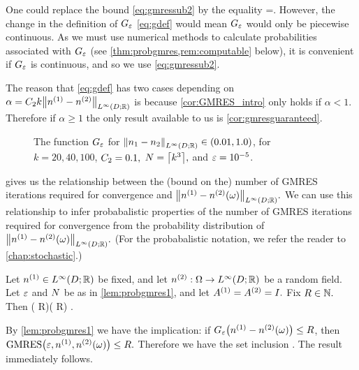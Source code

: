 One could replace the bound \cref{eq:gmressub2} by the equality
\beqs
\ms  =.
\eeqs
However, the change in the definition of $G_{\varepsilon}$ \cref{eq:gdef} would mean $G_{\varepsilon}$ would only be piecewise continuous. As we must use numerical methods to calculate probabilities associated with $G_{\varepsilon}$ (see \cref{thm:probgmres,rem:computable} below), it is convenient if $G_{\varepsilon}$ is continuous, and so we use \cref{eq:gmressub2}.
\ere

The reason that \cref{eq:gdef} has two cases depending on $\alpha = \Ct k \NLiDRR{\nso-\nst}$ is because \cref{cor:GMRES_intro} only holds if $\alpha < 1$. Therefore if $\alpha \geq 1$ the only result available to us is \cref{cor:gmresguaranteed}.
\ere

\begin{figure}
  \centering
  
  \caption[An upper bound on the number of GMRES iterations required for a nearby-preconditioned linear system.]{The function $G_{\varepsilon}$ for $\NLiDRR{\no-\nt} \in \mleft(0.01,1.0\mright)$, for $k=20,40,100$, $C_{2} = 0.1,$ $N=\ceil{k^3},$ and $\varepsilon = 10^{-5}$.\label{fig:G}}
    \end{figure}


 gives us the relationship between the (bound on the) number of GMRES iterations required for convergence and $\NLiDRR{\nso-\nst(\omega)}.$ We can use this relationship to infer probabalistic properties of the number of GMRES iterations required for convergence from the probability distribution of $\NLiDRR{\nso-\nst(\omega)}.$ (For the probabalistic notation, we refer the reader to \cref{chap:stochastic}.)

\label{thm:probgmres}
Let $\nso \in \LiDRR$ be fixed, and let $\nst:\Omega\rightarrow\LiDRR$ be a random field. Let $\varepsilon$ and $N$ be as in \cref{lem:probgmres1}, and let ${A}^{(1)} = {A}^{(2)} = I.$ Fix $ R \in \mathbb N.$ Then
\beq\label{eq:GMRESprob}
\PP\mleft(\Gfn{\NLiDRR{\nso-\nst}} \leq R\mright)\leq\PP\mleft(\GMRES{\eps}{\nso}{\nst} \leq R\mright) .
\eeq
\enth

By \cref{lem:probgmres1} we have the implication: if $\Gfn{\nso-\nst(\omega)} \leq R$, then $\GMRES{\eps}{\nso}{\nst(\omega)} \leq R.$ Therefore we have the set inclusion
\beqs
{} \subseteq {}.
\eeqs
The result immediately follows.
\epf




